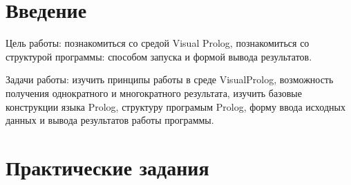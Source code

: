 \documentclass[a4paper, 14pt, unknownkeysallowed]{extreport}
\begin{document}

\setcounter{page}{2}

\chapter*{Введение}
Цель работы: познакомиться со средой Visual Prolog, познакомиться со
структурой программы: способом запуска и формой вывода результатов.

Задачи работы: изучить принципы работы в среде VisualProlog, возможность получения
однократного и многократного результата, изучить базовые конструкции языка Prolog,
структуру програмым Prolog, форму ввода исходных данных и вывода результатов работы
программы.

\chapter{Практические задания}
\end{document}
